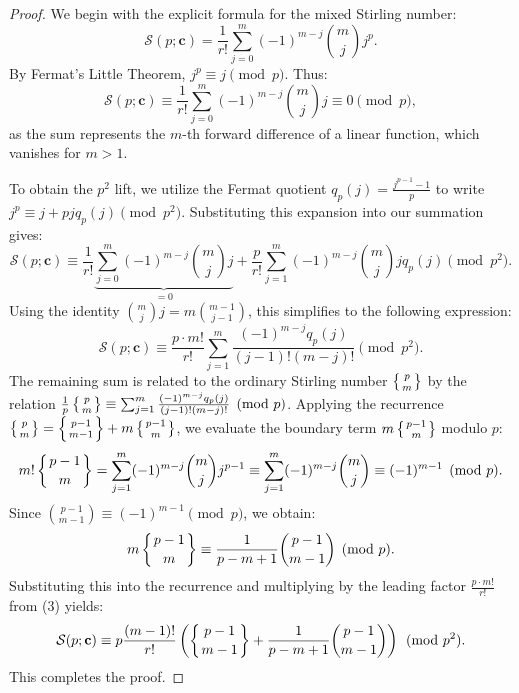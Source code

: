 \documentclass[12pt]{amsart}
\theoremstyle{definition}
\begin{document}
\begin{proof}
We begin with the explicit formula for the mixed Stirling number:
\begin{equation*}
    \mathcal{S}(p; \mathbf{c}) = \frac{1}{r!} \sum_{j=0}^m (-1)^{m-j} \binom{m}{j} j^p.
\end{equation*}
By Fermat's Little Theorem, $j^p \equiv j \pmod p$. Thus:
\begin{equation*}
    \mathcal{S}(p; \mathbf{c}) \equiv \frac{1}{r!} \sum_{j=0}^m (-1)^{m-j} \binom{m}{j} j \equiv 0 \pmod p,
\end{equation*}
as the sum represents the $m$-th forward difference of a linear function, which vanishes for $m > 1$.

To obtain the $p^2$ lift, we utilize the Fermat quotient $q_p(j) = \frac{j^{p-1}-1}{p}$ to write $j^p \equiv j + p j q_p(j) \pmod{p^2}$. Substituting this expansion into our summation gives:
\begin{equation*}
    \mathcal{S}(p; \mathbf{c}) \equiv \frac{1}{r!} \underbrace{\sum_{j=0}^m (-1)^{m-j} \binom{m}{j} j}_{= 0} + \frac{p}{r!} \sum_{j=1}^m (-1)^{m-j} \binom{m}{j} j q_p(j) \pmod{p^2}.
\end{equation*}
Using the identity $\binom{m}{j}j = m\binom{m-1}{j-1}$, this simplifies to the following expression:
\begin{equation}
    \mathcal{S}(p; \mathbf{c}) \equiv \frac{p \cdot m!}{r!} \sum_{j=1}^m \frac{(-1)^{m-j} q_p(j)}{(j-1)!(m-j)!} \pmod{p^2}.
\end{equation}
The remaining sum is related to the ordinary Stirling number $\left\{ \genfrac{}{}{0pt}{}{p}{m} \right\}$ by the relation $\frac{1}{p} \left\{ \genfrac{}{}{0pt}{}{p}{m} \right\} \equiv \sum_{j=1}^m \frac{(-1)^{m-j} q_p(j)}{(j-1)!(m-j)!} \pmod p$. Applying the recurrence $\left\{ \genfrac{}{}{0pt}{}{p}{m} \right\} = \left\{ \genfrac{}{}{0pt}{}{p-1}{m-1} \right\} + m \left\{ \genfrac{}{}{0pt}{}{p-1}{m} \right\}$, we evaluate the boundary term $m \left\{ \genfrac{}{}{0pt}{}{p-1}{m} \right\}$ modulo $p$:
\begin{equation*}
    m! \left\{ \genfrac{}{}{0pt}{}{p-1}{m} \right\} = \sum_{j=1}^m (-1)^{m-j} \binom{m}{j} j^{p-1} \equiv \sum_{j=1}^m (-1)^{m-j} \binom{m}{j} \equiv (-1)^{m-1} \pmod p.
\end{equation*}
Since $\binom{p-1}{m-1} \equiv (-1)^{m-1} \pmod p$, we obtain:
\begin{equation}
    m \left\{ \genfrac{}{}{0pt}{}{p-1}{m} \right\} \equiv \frac{1}{p-m+1} \binom{p-1}{m-1} \pmod p.
\end{equation}
Substituting this into the recurrence and multiplying by the leading factor $\frac{p \cdot m!}{r!}$ from (3) yields:
\begin{equation*}
    \mathcal{S}(p; \mathbf{c}) \equiv p \frac{(m-1)!}{r!} \left( \left\{ \genfrac{}{}{0pt}{}{p-1}{m-1} \right\} + \frac{1}{p-m+1} \binom{p-1}{m-1} \right) \pmod{p^2}.
\end{equation*}
This completes the proof.
\end{proof}
\end{document}
